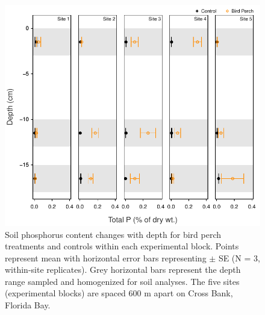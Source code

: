 \begin{figure}
  \centering
  \includegraphics[width=.9\textwidth]{Figures/chapter1/fig5}
\caption[Soil phosphorus content changes with depth for bird perch treatments and controls within each experimental block. Points represent mean with horizontal error bars representing $\pm$ SE (N = 3, within-site replicates). Grey horizontal bars represent the depth range sampled and homogenized for soil analyses. The five sites (experimental blocks) are spaced 600 m apart on Cross Bank, Florida Bay]{Soil phosphorus content changes with depth for bird perch treatments and controls within each experimental block. Points represent mean with horizontal error bars representing $\pm$ SE (N = 3, within-site replicates). Grey horizontal bars represent the depth range sampled and homogenized for soil analyses. The five sites (experimental blocks) are spaced 600 m apart on Cross Bank, Florida Bay.}
  \label{fig:1fig5}
\end{figure}


